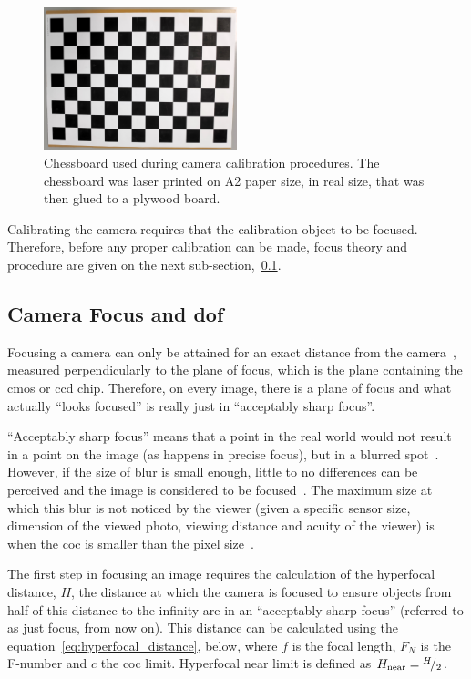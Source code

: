 \begin{figure}[H]
	\centering
	\includegraphics[width=0.5\textwidth]{img/experimental-setup/chessboard.jpg}
	\caption{Chessboard used during camera calibration procedures. The chessboard was laser printed on A2 paper size, in real size, that was then glued to a plywood board.}
	\label{fig:chessboard}
\end{figure}

Calibrating the camera requires that the calibration object to be focused. Therefore, before any proper calibration can be made, focus theory and procedure are given on the next sub-section,~\ref{subsec:calibration:camera-focus}.


\subsection{Camera Focus and \acl{dof}}
\label{subsec:calibration:camera-focus}
Focusing a camera can only be attained for an exact distance from the camera~\cite{Merklinger1993, Photopillers}, measured perpendicularly to the plane of focus, which is the plane containing the \ac{cmos} or \ac{ccd} chip. Therefore, on every image, there is a plane of focus and what actually ``looks focused'' is really just in ``acceptably sharp focus''.

``Acceptably sharp focus'' means that a point in the real world would not result in a point on the image (as happens in precise focus), but in a blurred spot~\cite{Photopillers}. However, if the size of blur is small enough, little to no differences can be perceived and the image is considered to be focused~\cite{Photopillers}. The maximum size at which this blur is not noticed by the viewer (given a specific sensor size, dimension of the viewed photo, viewing distance and acuity of the viewer) is when the \ac{coc} is smaller than the pixel size~\cite{Photopillers, Merklinger1993}.

The first step in focusing an image requires the calculation of the hyperfocal distance, $H$, the distance at which the camera is focused to ensure objects from half of this distance to the infinity are in an ``acceptably sharp focus'' (referred to as just focus, from now on). This distance can be calculated using the equation~\eqref{eq:hyperfocal_distance}, below, where $f$ is the focal length, $F_N$ is the F-number and $c$ the \ac{coc} limit. Hyperfocal near limit is defined as $H_\text{near} = {}^{H}\!/_{2}$.

